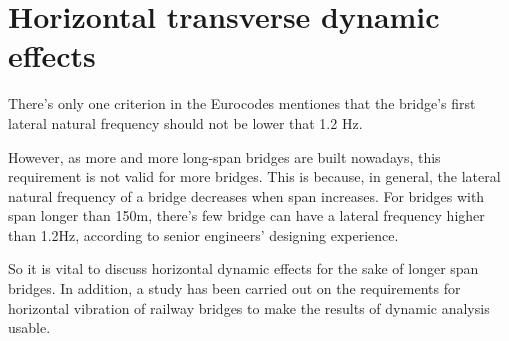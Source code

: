 \section{Horizontal transverse dynamic effects}
There's only one criterion in the Eurocodes mentiones that the bridge's first lateral natural frequency should not be lower that 1.2 Hz. 

However, as more and more long-span bridges are built nowadays, this requirement is not valid for more bridges. This is because, in general, the lateral natural frequency of a bridge decreases when span increases. For bridges with span longer than 150m, there's few bridge can have a lateral frequency higher than 1.2Hz, according to senior engineers' designing experience.

So it is vital to discuss horizontal dynamic effects for the sake of longer span bridges. In addition, a study has been carried out on the requirements for horizontal vibration of railway bridges to make the results of dynamic analysis usable.








